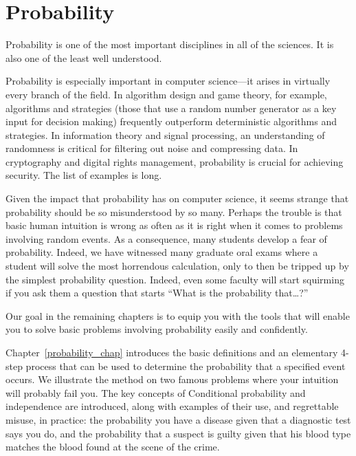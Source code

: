 \part{Probability}
\label{part:probability}

\partintro

Probability is one of the most important disciplines in all of the
sciences.  It is also one of the least well understood.

Probability is especially important in computer science---it arises in
virtually every branch of the field.  In algorithm design and game
theory, for example,  algorithms and strategies
(those that use a random number generator as a key input for decision
making) frequently outperform deterministic algorithms and
strategies.  In information theory and signal processing, an
understanding of randomness is critical for filtering out noise and
compressing data.  In cryptography and digital rights management,
probability is crucial for achieving security.  The list of examples
is long.

Given the impact that probability has on computer science, it seems
strange that probability should be so misunderstood by so many.
Perhaps the trouble is that basic human intuition is wrong as often as
it is right when it comes to problems involving random events.  As a
consequence, many students develop a fear of probability.  Indeed, we
have witnessed many graduate oral exams where a student will solve the
most horrendous calculation, only to then be tripped up by the simplest
probability question.  Indeed, even some faculty will start squirming
if you ask them a question that starts ``What is the probability
that\dots?''

Our goal in the remaining chapters is to equip you with the tools that
will enable you to solve basic problems involving probability easily
and confidently.

Chapter~\ref{probability_chap} introduces the basic definitions and an
elementary 4-step process that can be used to determine the
probability that a specified event occurs.  We illustrate the method
on two famous problems where your intuition will probably fail you.
The key concepts of Conditional probability and independence are
introduced, along with examples of their use, and regrettable misuse,
in practice: the probability you have a disease given that a
diagnostic test says you do, and the probability that a suspect is
guilty given that his blood type matches the blood found at the scene
of the crime.

